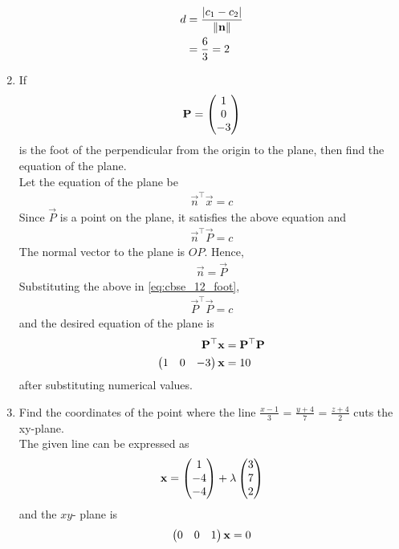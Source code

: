 \documentclass[journal,12pt,twocolumn]{IEEEtran}
\renewcommand\thesection{\arabic{section}}
\begin{document}
\begin{enumerate}[label=\thesection.\arabic*.,ref=\thesection.\theenumi]
\begin{align}
	d &= \frac{\left\vert c_1-c_2\right\vert}{\left\lVert\mathbf{n}\right\rVert} 
\\
	&= \frac{6}{3} = 2
\end{align}
\item 
    If 
	\begin{align}
		\mathbf{P} = \begin{pmatrix}1 \\ 0 \\-3\end{pmatrix}
\end{align}
    is the foot of the perpendicular from the origin to the plane, then find the equation of the plane.  
    \\
    \solution Let the equation of the plane be 
	\begin{align}
		\vec{n}^{\top}\vec{x} = c
\end{align}
Since $\vec{P}$ is a point on the plane, it satisfies the above equation and 
	\begin{align}
		\vec{n}^{\top}\vec{P} = c
		\label{eq:cbse_12_foot}
\end{align}
The normal vector to the plane is $OP$.  Hence, 
	\begin{align}
		\vec{n} = \vec{P} 
\end{align}
		Substituting the above in \eqref{eq:cbse_12_foot},
	\begin{align}
		\vec{P}^{\top}\vec{P} = c
		\label{eq:cbse_12_foot_sub}
\end{align}
and the desired equation of the plane is 
	\begin{align}
		\mathbf{P}^{\top}\mathbf{x} &= 		\mathbf{P}^{\top}\mathbf{P}
		\\
		\begin{pmatrix}1 & 0 &-3\end{pmatrix}\mathbf{x} &= 	10	
		\label{eq:cbse_12_foot_ans}
\end{align}
   after substituting numerical values. 
\item  Find the coordinates of the point where the line $\frac{x-1}{3}$ = $\frac{y+4}{7}$ = $\frac{z+4}{2}$ cuts the xy-plane.
	\\
	\solution 
	The given line can be expressed as 
	\begin{align}
		\mathbf{x} = \begin{pmatrix}1 \\ -4 \\ -4\end{pmatrix} + \lambda \begin{pmatrix}3 \\ 7 \\ 2\end{pmatrix}
		\label{eq:cbse_12_line_plane}
\end{align}
and the $xy$- plane is 
	\begin{align}
		\begin{pmatrix}0 & 0 &1\end{pmatrix}\mathbf{x}  = 0
		\label{eq:cbse_12_line_plane_eq}
\end{align}

\end{enumerate}
\end{document}
